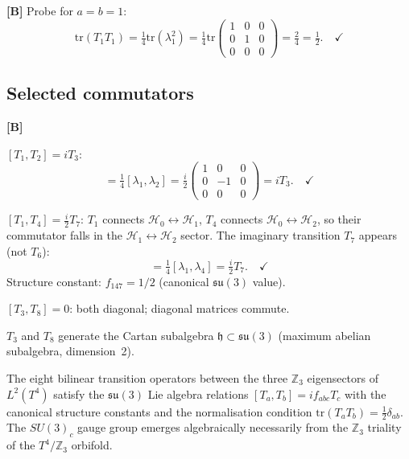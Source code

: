 \textbf{[B]} Probe for $a=b=1$:
\begin{equation}
  \mathrm{tr}(T_1T_1) = \tfrac{1}{4}\mathrm{tr}(\lambda_1^2)
  = \tfrac{1}{4}\mathrm{tr}
  \begin{pmatrix}1&0&0\\0&1&0\\0&0&0\end{pmatrix}
  = \tfrac{2}{4} = \tfrac{1}{2}.\quad\checkmark
\end{equation}

\subsection{Selected commutators}

\textbf{[B]}

$[T_1,T_2] = iT_3$:
\begin{equation}
  [T_1,T_2] = \tfrac{1}{4}[\lambda_1,\lambda_2]
  = \tfrac{i}{2}
  \begin{pmatrix}1&0&0\\0&{-1}&0\\0&0&0\end{pmatrix}
  = iT_3.\quad\checkmark
\end{equation}

$[T_1,T_4] = \tfrac{i}{2}T_7$: $T_1$ connects
$\mathcal{H}_0\leftrightarrow\mathcal{H}_1$, $T_4$ connects
$\mathcal{H}_0\leftrightarrow\mathcal{H}_2$, so their commutator
falls in the $\mathcal{H}_1\leftrightarrow\mathcal{H}_2$ sector.
The imaginary transition $T_7$ appears (not $T_6$):
\begin{equation}
  [T_1,T_4] = \tfrac{1}{4}[\lambda_1,\lambda_4]
  = \tfrac{i}{2}T_7.\quad\checkmark
\end{equation}
Structure constant: $f_{147} = 1/2$ (canonical $\mathfrak{su}(3)$ value).

$[T_3,T_8] = 0$: both diagonal; diagonal matrices commute. \checkmark

$T_3$ and $T_8$ generate the Cartan subalgebra $\mathfrak{h}
\subset\mathfrak{su}(3)$ (maximum abelian subalgebra, dimension~2).

\begin{keyresult}
The eight bilinear transition operators between the three
$\mathbb{Z}_3$ eigensectors of $L^2(T^4)$ satisfy the
$\mathfrak{su}(3)$ Lie algebra relations $[T_a,T_b]=if_{abc}T_c$
with the canonical structure constants and the normalisation condition
$\mathrm{tr}(T_aT_b)=\frac{1}{2}\delta_{ab}$.
The $SU(3)_c$ gauge group emerges algebraically necessarily from the
$\mathbb{Z}_3$ triality of the $T^4/\mathbb{Z}_3$ orbifold.
\end{keyresult}

